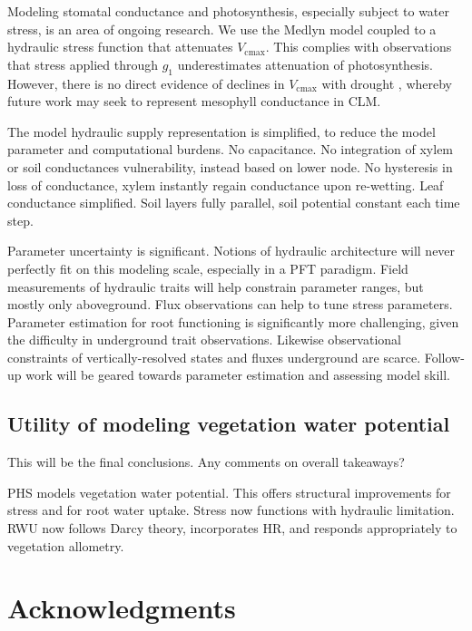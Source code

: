 \documentclass[draft,linenumbers]{agujournal}
\begin{document}
    Modeling stomatal conductance and photosynthesis, especially subject to water stress, is an area of ongoing research.
    We use the Medlyn model coupled to a hydraulic stress function that attenuates $V_{\text{cmax}}$.
    This complies with observations \citep{lin2018,zhou2013} that stress applied through $g_1$ underestimates attenuation of photosynthesis.
    However, there is no direct evidence of declines in $V_{\text{cmax}}$ with drought \citep{flexas2006}, whereby future work may seek to represent mesophyll conductance in CLM.
    
    The model hydraulic supply representation is simplified, to reduce the model parameter and computational burdens.
    No capacitance.
    No integration of xylem or soil conductances vulnerability, instead based on lower node.
    No hysteresis in loss of conductance, xylem instantly regain conductance upon re-wetting.
    Leaf conductance simplified.
    Soil layers fully parallel, soil potential constant each time step.
    
    Parameter uncertainty is significant.
    Notions of hydraulic architecture will never perfectly fit on this modeling scale, especially in a PFT paradigm.
    Field measurements of hydraulic traits will help constrain parameter ranges, but mostly only aboveground.
    Flux observations can help to tune stress parameters.
    Parameter estimation for root functioning is significantly more challenging, given the difficulty in underground trait observations.
    Likewise observational constraints of vertically-resolved states and fluxes underground are scarce.
    Follow-up work will be geared towards parameter estimation and assessing model skill.

\subsection{Utility of modeling vegetation water potential}

    This will be the final conclusions.
    Any comments on overall takeaways?

    PHS models vegetation water potential. 
    This offers structural improvements for stress and for root water uptake.
    Stress now functions with hydraulic limitation.
    RWU now follows Darcy theory, incorporates HR, and responds appropriately to vegetation allometry.

\section{Acknowledgments}
\end{document}

